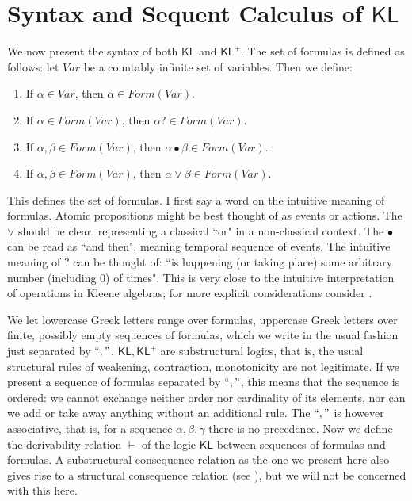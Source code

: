 \documentclass{eptcs}
\newcommand{\KL}{\mathsf{KL}}
\begin{document}
\section{Syntax and Sequent Calculus of $\KL$}

We now present the syntax of both $\KL$ and $\KL^+$. 
 The set of formulas is defined as follows:
let $\textit{Var}$ be a countably infinite set of variables. Then
we define:
\begin{enumerate}
\item If $\alpha\in \textit{Var}$, then $\alpha\in \textit{Form}(\textit{Var})$.
\item If $\alpha\in \textit{Form}(\textit{Var})$, then $\alpha?\in \textit{Form}(\textit{Var})$.
\item If $\alpha,\beta\in \textit{Form}(\textit{Var})$, then $\alpha\bullet\beta\in \textit{Form}(\textit{Var})$.
\item If $\alpha,\beta\in \textit{Form}(\textit{Var})$, then $\alpha\vee\beta\in \textit{Form}(\textit{Var})$.
\end{enumerate}

This defines the set of formulas. I first say a word on the
intuitive meaning of formulas. Atomic propositions might be best
thought of as events or actions. The $\vee$ should be clear,
representing a classical ``or" in a non-classical context. The $\bullet$
can be read as ``and then", meaning temporal sequence of events. The
intuitive meaning of $?$ can be thought of: ``is happening (or taking place)
some arbitrary number (including 0) of times". This is very close
to the intuitive interpretation of operations in Kleene algebras;
for more explicit considerations consider \cite{pratt:action}.

We let lowercase Greek letters range over formulas, uppercase
Greek letters over finite, possibly empty sequences of 
formulas,
which we write in the usual fashion just separated by
$``,"$. $\KL,\KL^+$ are substructural logics, that is, the usual
structural rules of weakening, contraction, monotonicity are
not legitimate. If we
present a sequence of formulas separated by $``,"$, this means that the
sequence is ordered: we cannot exchange neither order nor 
cardinality of its elements, nor can we add or take away anything without an
additional rule. The
$``,"$ is however associative, that is, 
for a sequence $\alpha,\beta,\gamma$
there is no precedence.
Now we define the derivability relation 
$\vdash$ of the logic $\KL$ between sequences of formulas and
formulas. A substructural consequence relation as the one we
present here also gives rise to a structural consequence
relation (see \cite{galatos:residuated}), but we will not be
concerned with this here.
\\
\end{document}
